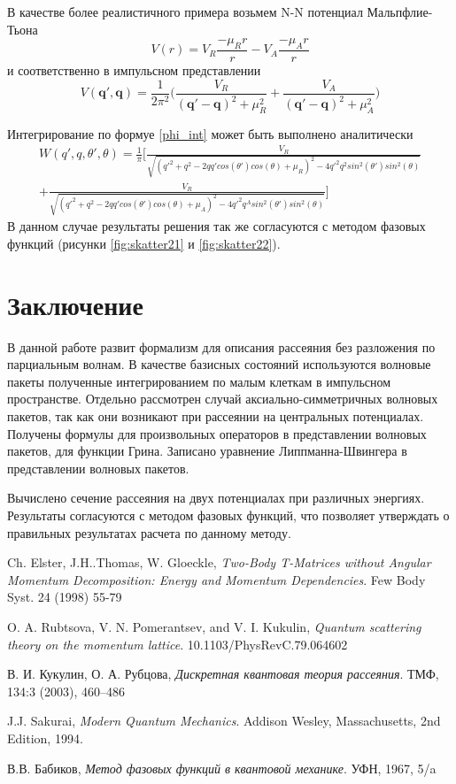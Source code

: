 \documentclass[a4paper,12pt]{article}
\newcommand{\vect}[1]{\boldsymbol{#1}}
\begin{document}
В качестве более реалистичного примера возьмем N-N потенциал Мальпфлие-Тьона
\[
V(r) = V_R\frac{-\mu_Rr}{r} - V_A\frac{-\mu_Ar}{r}
\]
и соответственно в импульсном представлении
\[
V(\vect{q'},\vect{q}) = \frac{1}{2\pi^2}\bigg( \frac{V_R}{(\vect{q'}-\vect{q})^2+\mu_R^2} + \frac{V_A}{(\vect{q'}-\vect{q})^2+\mu_A^2} \bigg)
\]

Интегрирование по формуе \ref{phi_int} может быть выполнено аналитически
\begin{multline}
W(q',q,\theta',\theta) = \frac{1}{\pi}\bigg[ \frac{V_R}{\sqrt{(q'^2+q^2-2qq'cos(\theta')cos(\theta)+\mu_R)^2 - 4q'^2q^2sin^2(\theta')sin^2(\theta) }} \\ +  \frac{V_R}{\sqrt{(q'^2+q^2-2qq'cos(\theta')cos(\theta)+\mu_A)^2 - 4q'^2q^Asin^2(\theta')sin^2(\theta) }} \bigg]
\end{multline}
В данном случае результаты решения так же согласуются с методом фазовых функций (рисунки \ref{fig:skatter21} и \ref{fig:skatter22}).

\newline
\section{Заключение}

В данной работе развит формализм для описания рассеяния без разложения по парциальным волнам. В качестве базисных состояний используются волновые пакеты полученные интегрированием по малым клеткам в импульсном пространстве. Отдельно рассмотрен случай аксиально-симметричных волновых пакетов, так как они возникают при рассеянии на центральных потенциалах. Получены формулы для произвольных операторов в представлении волновых пакетов, для функции Грина. Записано уравнение Липпманна-Швингера в представлении волновых пакетов.

Вычислено сечение рассеяния на двух потенциалах при различных энергиях. Результаты согласуются с методом фазовых функций, что позволяет утверждать о правильных результатах расчета по данному методу.


\pagebreak
{} 
\begin{thebibliography}{9}

  Ch. Elster, J.H..Thomas, W. Gloeckle,
  \emph{Two-Body T-Matrices without Angular Momentum Decomposition: Energy and Momentum Dependencies}.
  Few Body Syst. 24 (1998) 55-79

  O. A. Rubtsova, V. N. Pomerantsev, and V. I. Kukulin,
  \emph{Quantum scattering theory on the momentum lattice}.
  10.1103/PhysRevC.79.064602

  В. И. Кукулин, О. А. Рубцова,
  \emph{Дискретная квантовая теория рассеяния}.
  ТМФ, 134:3 (2003), 460–486 

  J.J. Sakurai,
  \emph{Modern Quantum Mechanics}.
  Addison Wesley, Massachusetts,
  2nd Edition,
  1994.

  В.В. Бабиков,
  \emph{Метод фазовых функций в квантовой механике}.
  УФН, 1967, 5/a

\end{thebibliography}


    
\end{document}
